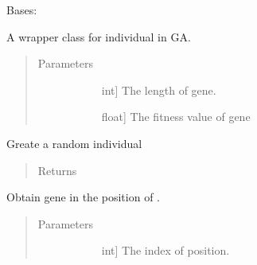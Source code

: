 \documentclass[letterpaper,10pt,english]{sphinxmanual}
\begin{document}
\begin{fulllineitems}
\label{\detokenize{pygace:pygace.ga.Individual}}
Bases: 

A wrapper class for individual in GA.
\begin{quote}\begin{description}
\item[{Parameters}] \leavevmode\begin{description}
\item[{}] \leavevmode{[}int{]}
The length of gene.

\item[{}] \leavevmode{[}float{]}
The fitness value of gene

\end{description}

\end{description}\end{quote}

\begin{fulllineitems}
\label{\detokenize{pygace:pygace.ga.Individual.generate_individual}}
Greate a random individual
\begin{quote}\begin{description}
\item[{Returns}] \leavevmode\begin{description}
\item[{}] \leavevmode
\end{description}

\end{description}\end{quote}

\end{fulllineitems}


\begin{fulllineitems}
\label{\detokenize{pygace:pygace.ga.Individual.get_gene}}
Obtain gene in the position of .
\begin{quote}\begin{description}
\item[{Parameters}] \leavevmode\begin{description}
\item[{}] \leavevmode{[}int{]}
The index of position.


\end{description}
\end{description}
\end{quote}
\end{fulllineitems}
\end{fulllineitems}
\end{document}
